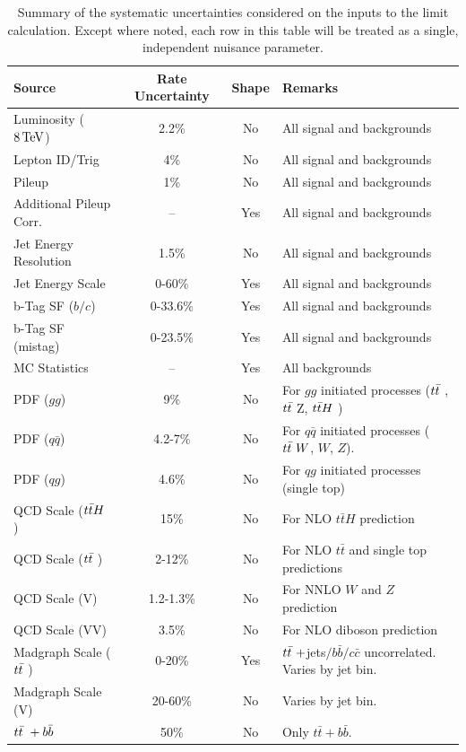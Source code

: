 \begin{table}[hbtp] \small
\centering
\caption{Summary of the systematic uncertainties considered on the inputs to the limit calculation.  Except where noted, each row in this table will be treated as a single, independent nuisance parameter.} 
\label{tab:syst}
\begin{tabular}{|l|c|c|l|}
\hline\hline
Source & Rate Uncertainty & Shape & Remarks \\
\hline
Luminosity ($8 \,\text{Te\hspace{-.08em}V}$) & 2.2\% & No & All signal and backgrounds \\
Lepton ID/Trig & 4\% & No & All signal and backgrounds \\
Pileup & 1\% & No & All signal and backgrounds \\
Additional Pileup Corr. & -- & Yes & All signal and backgrounds \\
Jet Energy Resolution & 1.5\% & No & All signal and backgrounds \\
Jet Energy Scale & 0-60\% & Yes & All signal and backgrounds \\
b-Tag SF ($b/c$) & 0-33.6\% & Yes & All signal and backgrounds \\
b-Tag SF (mistag) & 0-23.5\% & Yes & All signal and backgrounds \\
MC Statistics & -- & Yes & All backgrounds \\ 
\hline
PDF ($gg$) & 9\% & No & For $gg$ initiated processes ($t{\bar{t}}~$, $t{\bar{t}}~$Z, $t{\bar{t}}H~$) \\
PDF ($q\bar{q}$) & 4.2-7\% & No & For $q\bar{q}$ initiated processes ($t{\bar{t}}~ W$, $W$, $Z$). \\
PDF ($qg$) & 4.6\% & No & For $qg$ initiated processes (single top) \\
\hline
QCD Scale ($t{\bar{t}}H~$) & 15\% & No & For NLO $t\bar{t}H$ prediction \\
QCD Scale ($t{\bar{t}}~$) & 2-12\% & No & For NLO $t\bar{t}$ and single top predictions \\
QCD Scale (V) & 1.2-1.3\% & No & For NNLO $W$ and $Z$ prediction \\
QCD Scale (VV) & 3.5\% & No & For NLO diboson prediction \\
\hline
Madgraph Scale ($t{\bar{t}}~$) & 0-20\% & Yes & $t{\bar{t}}~+$jets$/b\bar{b}/c\bar{c}$ uncorrelated. Varies by jet bin.\\
Madgraph Scale (V) & 20-60\% & No & Varies by jet bin. \\
\hline
$t{\bar{t}}~ + b{\bar{b}}~$ & 50\% & No & Only $t\bar{t} + b\bar{b}$. \\
\hline\hline
\end{tabular}
\end{table}


